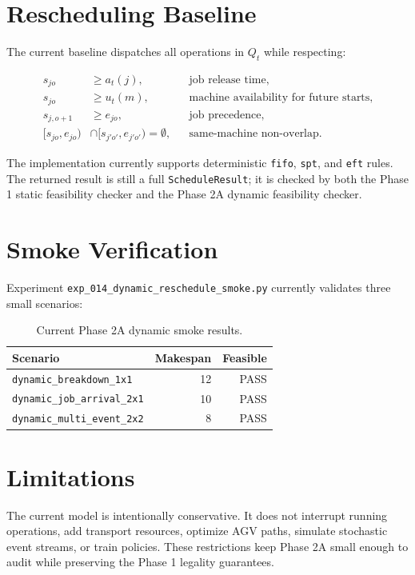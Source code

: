 \documentclass[11pt]{article}
\begin{document}
\section{Rescheduling Baseline}

The current baseline dispatches all operations in $Q_t$ while respecting:

\begin{align}
  s_{jo} &\ge a_t(j), && \text{job release time,}\\
  s_{jo} &\ge u_t(m), && \text{machine availability for future starts,}\\
  s_{j,o+1} &\ge e_{jo}, && \text{job precedence,}\\
  [s_{jo}, e_{jo}) &\cap [s_{j'o'}, e_{j'o'}) = \emptyset,
    && \text{same-machine non-overlap.}
\end{align}

The implementation currently supports deterministic \texttt{fifo},
\texttt{spt}, and \texttt{eft} rules. The returned result is still a full
\texttt{ScheduleResult}; it is checked by both the Phase 1 static feasibility
checker and the Phase 2A dynamic feasibility checker.

\section{Smoke Verification}

Experiment \texttt{exp\_014\_dynamic\_reschedule\_smoke.py} currently validates
three small scenarios:

\begin{table}[h]
\centering
\begin{tabular}{lrr}
\toprule
Scenario & Makespan & Feasible \\
\midrule
\texttt{dynamic\_breakdown\_1x1} & 12 & PASS \\
\texttt{dynamic\_job\_arrival\_2x1} & 10 & PASS \\
\texttt{dynamic\_multi\_event\_2x2} & 8 & PASS \\
\bottomrule
\end{tabular}
\caption{Current Phase 2A dynamic smoke results.}
\end{table}

\section{Limitations}

The current model is intentionally conservative. It does not interrupt running
operations, add transport resources, optimize AGV paths, simulate stochastic
event streams, or train policies. These restrictions keep Phase 2A small enough
to audit while preserving the Phase 1 legality guarantees.
\end{document}
